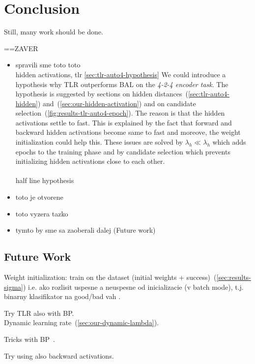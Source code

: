 \section*{Conclusion}
\label{sec:conclusion} 

Still, many work should be done. 


==ZAVER 
\begin{itemize} 
\item   spravili sme toto toto \\ 
hidden activations, tlr \ref{sec:tlr-auto4-hypothesis} 
We could introduce a hypothesis why TLR outperforms BAL on the \emph{4-2-4 encoder task}. The hypothesis is suggested by sections on hidden distances~(\ref{sec:tlr-auto4-hidden}) and~(\ref{sec:our-hidden-activation}) and on candidate selection~(\ref{fig:results-tlr-auto4-epoch}). The reason is that the hidden activations settle to fast. This is explained by the fact that forward and backward hidden activations become same to fast and moreove, the weight initialization could help this. These issues are solved by $\lambda_h \ll \lambda_h$ which adds epochs to the training phase and by candidate selection which prevents initializing hidden activations close to each other. \\
\\
half line hypothesis 
\item   toto je otvorene
\item   toto vyzera tazko
\item   tymto by sme sa zaoberali dalej (Future work) 

\end{itemize} 


\subsection*{Future Work} 
Weight initialization: train on the dataset (initial weights + success)~(\ref{sec:results-sigma}) 
i.e. ako rozlisit uspesne a neuspesne od inicializacie (v batch mode), t.j. binarny klasifikator na good/bad vah . 

Try TLR also with BP.  \\ 

\label{sec:future-dlr} 
Dynamic learning rate~(\ref{sec:our-dynamic-lambda}). 

Tricks with BP~\citep{lecun2012efficient}. 

Try using also backward activations.


